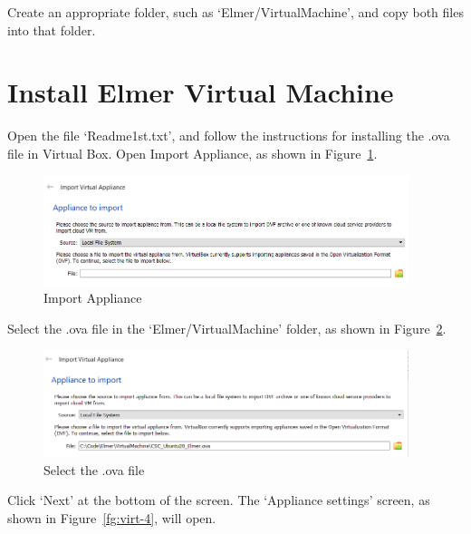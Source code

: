 Create an appropriate folder, such as `Elmer/VirtualMachine', and copy both files into that folder.  

\section{Install Elmer Virtual Machine}

Open the file `Readme1st.txt', and follow the instructions for installing the .ova file in Virtual Box.  Open Import Appliance, as shown in Figure~\ref{fg:virt-2}.

\begin{figure}[H]
\begin{center}
\includegraphics[width=0.95\textwidth]{virt-2}
\caption{Import Appliance}\label{fg:virt-2}
\end{center}
\end{figure}

Select the .ova file in the `Elmer/VirtualMachine' folder, as shown in Figure~\ref{fg:virt-3}. 

\begin{figure}[H]
\begin{center}
\includegraphics[width=0.95\textwidth]{virt-3}
\caption{Select the .ova file}\label{fg:virt-3}
\end{center}
\end{figure}

Click `Next' at the bottom of the screen.  The `Appliance settings' screen, as shown in Figure~\ref{fg:virt-4}, will open.  

